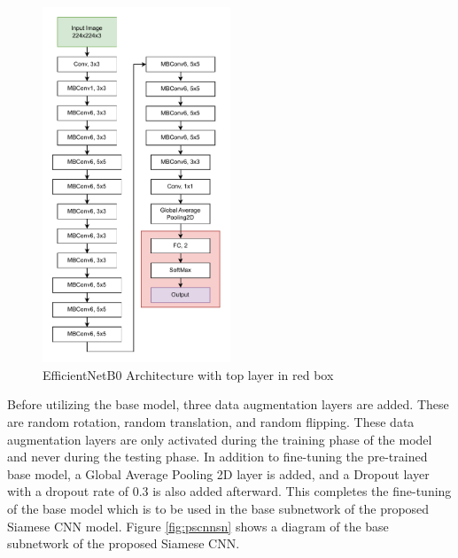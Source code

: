 \begin{figure}[h]
	\centering
	\includegraphics[width=0.5\textwidth]{graphics/images/EfficientNetB0.pdf}
	\caption{EfficientNetB0 Architecture with top layer in red box}
	\label{fig:efficientNetB0}
\end{figure}

Before utilizing the base model, three data augmentation layers are added. These are random rotation, random translation, and random flipping. These data augmentation layers are only activated during the training phase of the model and never during the testing phase. In addition to fine-tuning the pre-trained base model, a Global Average Pooling 2D layer is added, and a Dropout layer with a dropout rate of 0.3 is also added afterward. This completes the fine-tuning of the base model which is to be used in the base subnetwork of the proposed Siamese CNN model. Figure \ref{fig:pscnnsn} shows a diagram of the base subnetwork of the proposed Siamese CNN.

